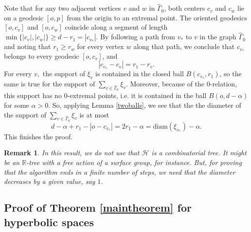\documentclass[11pt,letterpaper]{amsart}
\newtheorem*{remark}{Remark}
\begin{document}
Note that for any two adjacent vertices $v$ and $w$ in $\hat{\Gamma}_0$,
both centers $c_v$ and $c_w$ lie on a geodesic $[o, p]$ from the origin to an
extremal point. The oriented geodesics $[o, c_v]$ and $[o, c_w]$ coincide
along a segment of length $\min \{|c_v |, |c_w |\} \geq d - r_1 = | c_{v_*} |
.$ By following a path from $v_*$ to $v$ in the graph $\hat{\Gamma}_0$ and noting that
$r_1 \geq r_w$ for every vertex $w$ along that path, we conclude that
$c_{v_*}$ belongs to every geodesic $[o, c_v]$, and
\[ |c_{v_*} - c_v | = r_1 - r_v . \]
For every $v,$ the support of $\xi_v$ is contained in the closed ball $B
(c_{v_*}, r_1)$, so the same is true for the support of $\sum_{v \in\hat\Gamma_0} \xi_v$. Moreover, because of the $0$-relation, this support has no $0$-extremal points, i.e. it is contained in the ball $B (o, d-\alpha)$ for some $\alpha > 0$. So, applying Lemma \ref{twoballs}, we see that the the diameter of the support of $\sum_{v\in\hat\Gamma_0}\xi_v$ is at most
$$
d - \alpha + r_1 - |o - c_{v_*} | = 2 r_1 -\alpha= \mathrm{diam} (\xi_{v_*}) -
\alpha .
$$
This finishes the proof. 
\begin{remark}
In this result, we do not use that $\mathcal{H}$ is a combinatorial tree. It
might be an $\mathbb{R}$-tree with a free action of a surface group, for instance. But, for proving that the algorithm ends in a finite number of steps, we need that the diameter decreases by a given value, say $1$.
\end{remark}





\subsection{Proof of Theorem \ref{maintheorem} for hyperbolic spaces\label{proofsubsection}}



\end{document}
